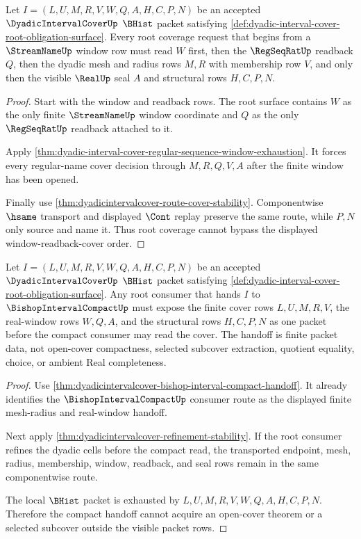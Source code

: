\begin{theorem}
\label{thm:dyadic-interval-cover-root-window-coverage}
Let $I=(L,U,M,R,V,W,Q,A,H,C,P,N)$ be an accepted $\DyadicIntervalCoverUp$ $\BHist$ packet satisfying \autoref{def:dyadic-interval-cover-root-obligation-surface}. Every root coverage request that begins from a $\StreamNameUp$ window row must read $W$ first, then the $\RegSeqRatUp$ readback $Q$, then the dyadic mesh and radius rows $M,R$ with membership row $V$, and only then the visible $\RealUp$ seal $A$ and structural rows $H,C,P,N$.
\end{theorem}
\begin{proof}
Start with the window and readback rows. The root surface contains $W$ as the only finite $\StreamNameUp$ window coordinate and $Q$ as the only $\RegSeqRatUp$ readback attached to it.

Apply \autoref{thm:dyadic-interval-cover-regular-sequence-window-exhaustion}. It forces every regular-name cover decision through $M,R,Q,V,A$ after the finite window has been opened.

Finally use \autoref{thm:dyadicintervalcover-route-cover-stability}. Componentwise $\hsame$ transport and displayed $\Cont$ replay preserve the same route, while $P,N$ only source and name it. Thus root coverage cannot bypass the displayed window-readback-cover order.
\end{proof}

\begin{theorem}
\label{thm:dyadic-interval-cover-root-compact-handoff}
Let $I=(L,U,M,R,V,W,Q,A,H,C,P,N)$ be an accepted $\DyadicIntervalCoverUp$ $\BHist$ packet satisfying \autoref{def:dyadic-interval-cover-root-obligation-surface}. Any root consumer that hands $I$ to $\BishopIntervalCompactUp$ must expose the finite cover rows $L,U,M,R,V$, the real-window rows $W,Q,A$, and the structural rows $H,C,P,N$ as one packet before the compact consumer may read the cover. The handoff is finite packet data, not open-cover compactness, selected subcover extraction, quotient equality, choice, or ambient Real completeness.
\end{theorem}
\begin{proof}
Use \autoref{thm:dyadicintervalcover-bishop-interval-compact-handoff}. It already identifies the $\BishopIntervalCompactUp$ consumer route as the displayed finite mesh-radius and real-window handoff.

Next apply \autoref{thm:dyadicintervalcover-refinement-stability}. If the root consumer refines the dyadic cells before the compact read, the transported endpoint, mesh, radius, membership, window, readback, and seal rows remain in the same componentwise route.

The local $\BHist$ packet is exhausted by $L,U,M,R,V,W,Q,A,H,C,P,N$. Therefore the compact handoff cannot acquire an open-cover theorem or a selected subcover outside the visible packet rows.
\end{proof}

